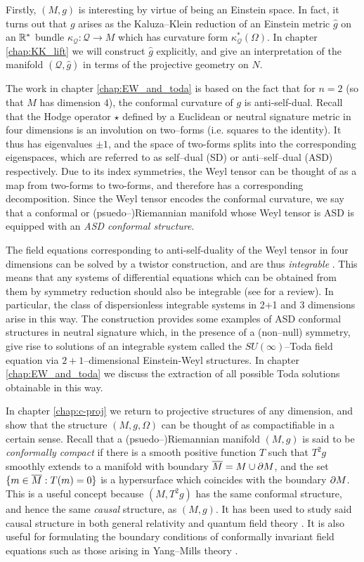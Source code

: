 Firstly, $(M,g)$ is interesting by virtue of being an Einstein
space. In fact, it turns out that $g$ arises as the Kaluza--Klein reduction of an Einstein metric $\hat{g}$ on an $\mathbb{R}^*$ bundle $\kappa_\mathcal{Q}:\mathcal{Q}\rightarrow M$ which has curvature form $\kappa_\mathcal{Q}^*(\Omega)$. In chapter \ref{chap:KK_lift} we will construct $\hat{g}$ explicitly, and give an interpretation of the manifold $(\mathcal{Q},\hat{g})$ in terms of the projective geometry on $N$.

The work in chapter \ref{chap:EW_and_toda} is based on the fact that for $n=2$ (so that $M$ has dimension $4$), the conformal
curvature of $g$ is anti-self-dual. Recall that the Hodge operator
$\star$ defined by a Euclidean or neutral signature metric in four
dimensions is an involution on two--forms (i.e. squares to the identity).
It thus has eigenvalues $\pm1$, and the space of two-forms splits
into the corresponding eigenspaces, which are referred to as self--dual
(SD) or anti--self--dual (ASD) respectively. Due to its index symmetries,
the Weyl tensor can be thought of as a map from two-forms to two-forms,
and therefore has a corresponding decomposition. Since the Weyl tensor
encodes the conformal curvature, we say that a conformal or (psuedo--)Riemannian
manifold whose Weyl tensor is ASD is equipped with an \textit{ASD
conformal structure}.

The field equations corresponding to anti-self-duality of the Weyl
tensor in four dimensions can be solved by a twistor construction,
and are thus \textit{integrable} \cite{ward}. This means that any systems of differential
equations which can be obtained from them by symmetry reduction should
also be integrable (see \cite{MW} for a review). In particular, the class of dispersionless
integrable systems in 2+1 and 3 dimensions arise in this way. The
construction \cite{DM} provides some examples of
ASD conformal structures in neutral signature which, in the presence
of a (non--null) symmetry, give rise to solutions of an integrable
system called the $SU(\infty)$--Toda field equation via $2+1$--dimensional
Einstein-Weyl structures. In chapter \ref{chap:EW_and_toda} we discuss the extraction
of all possible Toda solutions obtainable in this way.

In chapter \ref{chap:c-proj} we return to projective structures of any dimension, and show that the structure $(M,g,\Omega)$ can be thought of as compactifiable in a certain sense. Recall that a (psuedo--)Riemannian manifold $(M,g)$ is said to be \textit{conformally compact} if there is a smooth positive function $T$ such that $T^2g$ smoothly extends to a manifold with boundary $\overline{M}=M\cup\partial M$, and the set $\{m\in\overline{M}:T(m)=0\}$ is a hypersurface which coincides with the boundary $\partial M$.  This is a useful concept because $(M,T^2g)$ has the same conformal structure, and hence the same \textit{causal} structure, as $(M,g)$. It has been used to study said causal structure in both general relativity \cite{penrose65} and quantum field theory \cite{witten}. It is also useful for formulating the boundary conditions of conformally invariant field equations such as those arising in Yang--Mills theory \cite{uhlen}.

